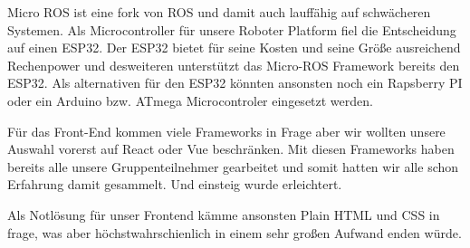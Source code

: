 \begin{flushleft}
    Micro ROS ist eine fork von ROS und damit auch lauffähig auf schwächeren Systemen.
    Als Microcontroller für unsere Roboter Platform fiel die Entscheidung auf einen ESP32.
    Der ESP32 bietet für seine Kosten und seine Größe ausreichend Rechenpower und
    desweiteren unterstützt das Micro-ROS Framework bereits den ESP32.
    Als alternativen für den ESP32 könnten ansonsten noch ein Rapsberry PI oder ein Arduino
    bzw. ATmega Microcontroler eingesetzt werden.

    Für das Front-End kommen viele Frameworks in Frage aber wir wollten unsere Auswahl vorerst auf React oder Vue beschränken.
    Mit diesen Frameworks haben bereits alle unsere Gruppenteilnehmer gearbeitet und somit hatten wir
    alle schon Erfahrung damit gesammelt. Und einsteig wurde erleichtert.

    Als Notlösung für unser Frontend kämme ansonsten Plain HTML und CSS in frage, was aber höchstwahrschienlich
    in einem sehr großen Aufwand enden würde.
\end{flushleft}